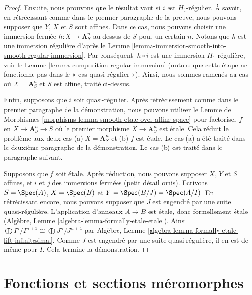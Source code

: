 \begin{proof}
\medskip\noindent
Ensuite, nous prouvons que le résultat vaut si  $i$  est
 $H_1$-régulier. À savoir, en rétrécissant comme dans le premier paragraphe
de la preuve, nous pouvons supposer que  $Y$,  $X$ et  $S$ 
sont affines. Dans ce cas, nous pouvons choisir une immersion fermée  $h : X \to \mathbf{A}^n_S$ 
au-dessus de  $S$  pour un certain  $n$. Notons que  $h$  est
une immersion régulière d'après le Lemme  \ref{lemma-immersion-smooth-into-smooth-regular-immersion}. Par conséquent,
 $h \circ i$  est une immersion  $H_1$-régulière, voir le Lemme  \ref{lemma-composition-regular-immersion} 
 (notons que cette étape ne fonctionne pas dans le « cas quasi-régulier »). Ainsi,
nous sommes ramenés au cas où  $X = \mathbf{A}^n_S$  et  $S$  est affine, traité
ci-dessus.

\medskip\noindent
Enfin, supposons que  $i$  soit quasi-régulier. Après rétrécissement comme
dans le premier paragraphe de la démonstration, nous pouvons utiliser le
Lemme de Morphismes  \ref{morphisms-lemma-smooth-etale-over-affine-space}  pour factoriser  $f$  en  $X \to \mathbf{A}^n_S \to S$  où
le premier morphisme  $X \to \mathbf{A}^n_S$  est  étale. Cela réduit le problème
aux deux cas (a)  $X = \mathbf{A}^n_S$  et (b)  $f$  est  étale. Le cas
(a) a été traité dans le deuxième paragraphe de la démonstration. Le cas (b) est
traité dans le paragraphe suivant.

\medskip\noindent
Supposons que  $f$  soit  étale. Après réduction, nous pouvons
supposer  $X$,  $Y$ et  $S$  affines, et  $i$  et  $j$  des immersions
fermées (petit détail omis). Écrivons
 $S = \Spec(A)$,  $X = \Spec(B)$  et  $Y = \Spec(B/J) = \Spec(A/I)$. En rétrécissant encore, nous pouvons
supposer que  $J$  est engendré par une suite quasi-régulière.
L'application d'anneaux  $A \to B$  est  étale, donc formellement
 étale (Algèbre, Lemme  \ref{algebra-lemma-formally-etale-etale}). Ainsi  $\bigoplus I^n/I^{n + 1} \cong \bigoplus J^n/J^{n + 1}$  par Algèbre,
Lemme  \ref{algebra-lemma-formally-etale-lift-infinitesimal}. Comme  $J$  est engendré par une suite quasi-régulière,
il en est de même pour  $I$. Cela termine la démonstration.
\end{proof}











\section{Fonctions et sections méromorphes}
\label{section-meromorphic-functions}

